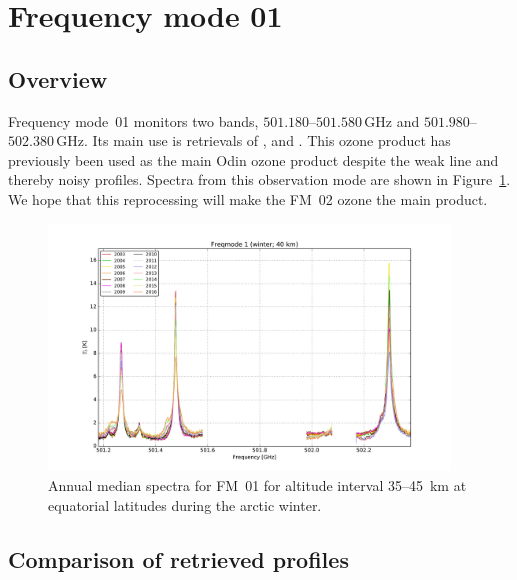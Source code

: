 \section{Frequency mode 01}
\label{sec:fm01}

\subsection{Overview}
\label{sec:fm01:overview}
Frequency mode~01 monitors two bands, $501.180$--$501.580\,\mathrm{GHz}$ and
$501.980$--$502.380\,\mathrm{GHz}$. Its main use is retrievals of ,
 and . This ozone product has previously been used as
the main Odin ozone product despite the weak line and thereby noisy profiles.
Spectra from this observation mode are shown in Figure~\ref{fig:spectra:01}.
We hope that this reprocessing will make the FM~02 ozone the main product.


\begin{figure}[ht]
    \centering
    \includegraphics[width=0.95\textwidth]{../DDS/figures/spectra/fm_01_spectra_winter}
    \caption{Annual median spectra for FM~01 for altitude interval 35--45~km at
        equatorial latitudes during the arctic winter.
    }\label{fig:spectra:01}
\end{figure}


\subsection{Comparison of retrieved profiles}
\label{sec:fm01:comparison}



